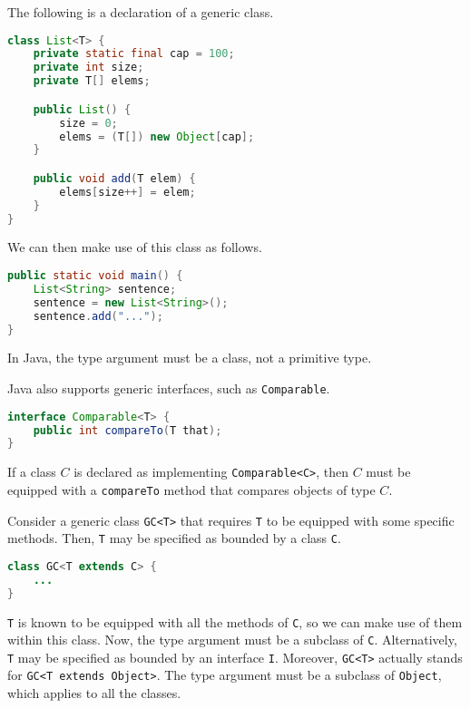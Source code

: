 \documentclass[a4paper, openany]{memoir}
\begin{document}
The following is a declaration of a generic class.
\begin{lstlisting}[language=Java]
class List<T> {
    private static final cap = 100;
    private int size;
    private T[] elems;

    public List() {
        size = 0;
        elems = (T[]) new Object[cap];
    }

    public void add(T elem) {
        elems[size++] = elem;
    }
}
\end{lstlisting}
We can then make use of this class as follows.
\begin{lstlisting}[language=Java]
public static void main() {
    List<String> sentence;
    sentence = new List<String>();
    sentence.add("...");
}
\end{lstlisting}
In Java, the type argument must be a class, not a primitive type.

Java also supports generic interfaces, such as \texttt{Comparable}.
\begin{lstlisting}[language=Java]
interface Comparable<T> {
    public int compareTo(T that);
}
\end{lstlisting}
If a class $C$ is declared as implementing \texttt{Comparable<C>}, then $C$ must be equipped with a \texttt{compareTo} method that compares objects of type $C$.

Consider a generic class \texttt{GC<T>} that requires \texttt{T} to be equipped with some specific methods. Then, \texttt{T} may be specified as bounded by a class \texttt{C}.
\begin{lstlisting}[language=Java]
class GC<T extends C> {
    ...
}
\end{lstlisting}
\texttt{T} is known to be equipped with all the methods of \texttt{C}, so we can make use of them within this class. Now, the type argument must be a subclass of \texttt{C}. Alternatively, \texttt{T} may be specified as bounded by an interface \texttt{I}. Moreover, \texttt{GC<T>} actually stands for \texttt{GC<T extends Object>}. The type argument must be a subclass of \texttt{Object}, which applies to all the classes.
\end{document}
